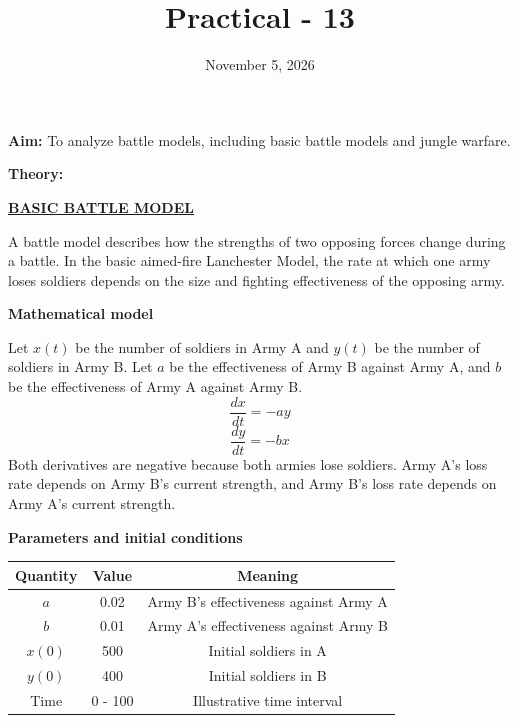 \documentclass{article}
\title{\textbf{Practical - 13}}
\author{}
\date{November 5, 2026}
\begin{document}
\maketitle

\noindent
\textbf{\large{Aim:}} To analyze battle models, including basic battle models and jungle warfare.

\vspace{1em}
\noindent
\textbf{\large{Theory:}}

\begin{center}
\textbf{\underline{BASIC BATTLE MODEL}}
\end{center}

\noindent
A battle model describes how the strengths of two  opposing forces change during a battle. In the basic aimed-fire Lanchester Model, the rate at which one army loses soldiers depends on the size and fighting effectiveness of the opposing army.

\vspace{1.5em}
\noindent
\textbf{Mathematical model}

\noindent
Let $x(t)$ be the number of soldiers in Army A and $y(t)$ be the number of soldiers in Army B. Let $a$ be the effectiveness of Army B against Army A, and $b$ be the effectiveness of Army A against Army B.
\[\frac{dx}{dt} = -ay\]
\[\frac{dy}{dt} = -bx\]
\noindent
Both derivatives are negative because both armies lose soldiers. Army A's loss rate depends on Army B's current strength, and Army B's loss rate depends on Army A's current strength.

\vspace{1.5em}
\noindent
\textbf{Parameters and initial conditions}
\begin{table}[h]
    \centering
    \begin{tabular}{|c|c|c|}
    \hline
    \textbf{Quantity} & \textbf{Value} &  \textbf{Meaning}\\
    \hline
    $a$ & 0.02 & Army B's effectiveness against Army A \\
    \hline
    $b$ & 0.01 & Army A's effectiveness against Army B \\
    \hline
    $x(0)$ & 500 & Initial soldiers in A \\
    \hline
    $y(0)$ & 400 & Initial soldiers in B \\
    \hline
    Time & 0 - 100 & Illustrative time interval \\
    \hline
    \end{tabular}
\end{table}
\end{document}
